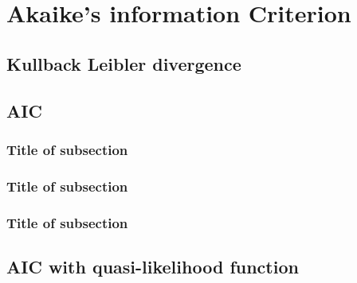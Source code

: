 \chapter{Akaike's information Criterion}

\fancyhead[RO,LE]{\thepage}

\setlength{\parskip}{0.5pt}

\bigskip

\section{Kullback Leibler divergence } 
\noindent
\cite{azzalini01}

\section{AIC }
\noindent
\cite{bart53}

\subsection{Title of subsection}
\noindent
\cite{brglm2}

\subsection{Title of subsection}
\noindent
\cite{staf92}

\subsection{Title of subsection}
\noindent
\cite{dicicciostern93}

\section{AIC with quasi-likelihood function}
\noindent